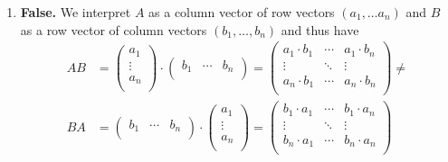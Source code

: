 \documentclass{article}
\begin{document}
\begin{enumerate}
    \item \textbf{False.} We interpret $A$ as a column vector of row vectors $(a_1, \ldots a_n)$ and $B$ as a row vector of column vectors $(b_1, \ldots, b_n)$ and thus have
    \begin{align*}
        AB &= \begin{pmatrix}
            a_1 \\
            \vdots \\
            a_n \\
        \end{pmatrix} \cdot 
        \begin{pmatrix}
            b_1 & \cdots & b_n \\
        \end{pmatrix}
        =
        \begin{pmatrix}
            a_1 \cdot b_1 & \cdots & a_1 \cdot b_n \\
            \vdots & \ddots & \vdots \\
            a_n \cdot b_1 & \cdots & a_n \cdot b_n \\
        \end{pmatrix} \neq \\
        BA &= \begin{pmatrix}
            b_1 & \cdots & b_n \\
        \end{pmatrix} \cdot
        \begin{pmatrix}
            a_1 \\
            \vdots \\
            a_n \\
        \end{pmatrix}
        =
        \begin{pmatrix}
            b_1 \cdot a_1 & \cdots & b_1 \cdot a_n \\
            \vdots & \ddots & \vdots \\
            b_n \cdot a_1 & \cdots & b_n \cdot a_n \\
        \end{pmatrix}
    \end{align*}
    

\end{enumerate}
\end{document}
